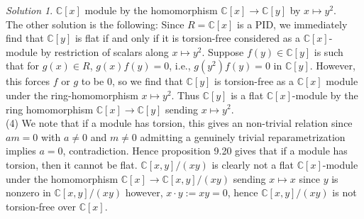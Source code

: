 \documentclass[reqno]{amsart}
\theoremstyle{definition}
\theoremstyle{remark}
\newtheorem*{solution}{Solution}
\begin{document}
\begin{solution}
     $\mathbb{C}[x]$ module by the homomorphism
     $\mathbb{C}[x] \to \mathbb{C}[y]$ by
     $x \mapsto y^2$.\\
     \linebreak
     The other solution is the following:
         Since $R = \mathbb{C} \left[ x \right] $ is a
         PID, we immediately find that
         $\mathbb{C} \left[ y \right] $ is
         flat if and only if it is torsion-free considered
         as a  $\mathbb{C}\left[ x \right] $-module by
         restriction of scalars along
         $x \mapsto y^2$. Suppose
         $f(y) \in \mathbb{C}[y]$ is such that
         for  $g(x) \in R$,
         $g(x) f(y) = 0$, i.e.,
         $g(y^2) f(y) = 0$ in $\mathbb{C}[y]$. However, this
         forces $f$ or $g$ to be $0$, so
         we find that
         $\mathbb{C} [y]$ is torsion-free as a
         $\mathbb{C} [x]$ module under the ring-homomorphism
         $x \mapsto y^2$. Thus
         $\mathbb{C}[y]$ is a flat
         $\mathbb{C}[x]$-module by the ring homomorphism
         $\mathbb{C}[x] \to \mathbb{C}[y]$ sending
         $x \mapsto y^2$.\\
         \linebreak
         (4)
         We note that if a module has torsion, this
         gives an non-trivial relation since
         $am = 0$ with $a \neq 0$  and
         $m \neq 0$
         admitting a genuinely trivial reparametrization
         implies $a = 0$, contradiction. Hence
         proposition 9.20 gives that if a module
         has torsion, then it cannot be flat.
         $\mathbb{C} \left[ x,y \right] /(xy)$ is clearly
         not a flat
         $\mathbb{C} \left[ x \right] $-module under the
         homomorphism
         $\mathbb{C} \left[ x \right] \to
         \mathbb{C} \left[ x,y \right] /(xy)$ sending
         $x\mapsto x$ since
         $y $ is nonzero in
         $\mathbb{C} \left[ x,y \right] /(xy)$ however,
         $x \cdot y := xy = 0$, hence
         $\mathbb{C} \left[ x,y \right] /(xy)$ is not
         torsion-free over $\mathbb{C}\left[ x \right] $.
    \end{solution}
\end{document}
